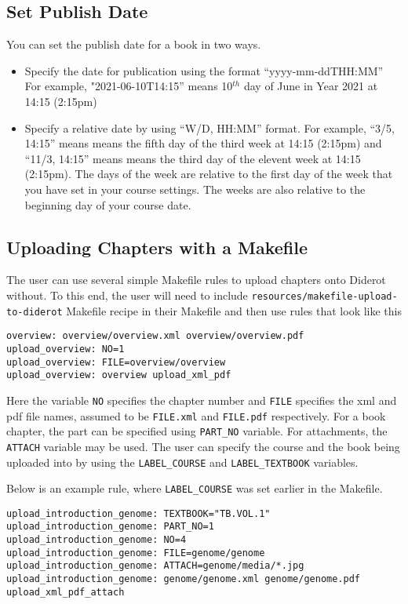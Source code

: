 \subsection{Set Publish Date}
You can set the publish date for a book in two ways.
\begin{itemize}
\item Specify the date for publication using the format
  ``yyyy-mm-ddTHH:MM'' For example, "2021-06-10T14:15'' means
  10$^{th}$ day of June in Year 2021 at 14:15 (2:15pm)
\item Specify a relative date by using ``W/D, HH:MM'' format.  For
  example, ``3/5, 14:15'' means means the fifth day of the third week
  at 14:15 (2:15pm) and ``11/3, 14:15'' means means the third day of
  the elevent week at 14:15 (2:15pm).  The days of the week are
  relative to the first day of the week that you have set in your
  course settings.  The weeks are also relative to the beginning day
  of your course date.
\end{itemize}

\subsection{Uploading Chapters with a Makefile}

\begin{gram}
The user can use several simple Makefile rules to upload chapters onto
Diderot without.  To this end, the user will need to include
\verb|resources/makefile-upload-to-diderot| Makefile recipe in their
Makefile and then use rules that look like this
\begin{verbatim}
overview: overview/overview.xml overview/overview.pdf
upload_overview: NO=1
upload_overview: FILE=overview/overview
upload_overview: overview upload_xml_pdf
\end{verbatim}

Here the variable \verb|NO| specifies the chapter number and \verb|FILE| specifies the xml and pdf file names, assumed to be \verb|FILE.xml| and \verb|FILE.pdf| respectively.  
%
For a book chapter, the part can be specified using \verb|PART_NO| variable.
%
For attachments, the \verb|ATTACH| variable may be used.
%
The user can specify the course and the book being uploaded into by using the
\verb|LABEL_COURSE| and \verb|LABEL_TEXTBOOK| variables. 

Below is an example rule, where \verb|LABEL_COURSE| was set earlier in the Makefile.


\begin{verbatim}
upload_introduction_genome: TEXTBOOK="TB.VOL.1"
upload_introduction_genome: PART_NO=1 
upload_introduction_genome: NO=4
upload_introduction_genome: FILE=genome/genome
upload_introduction_genome: ATTACH=genome/media/*.jpg 
upload_introduction_genome: genome/genome.xml genome/genome.pdf upload_xml_pdf_attach
\end{verbatim}
\end{gram}

